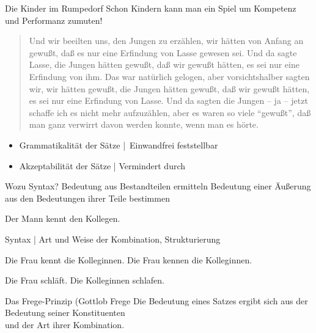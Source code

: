  
\begin{frame}
  {Die Kinder im Rumpedorf}
  \onslide<+->
  \onslide<+->
  Schon Kindern kann man ein Spiel um Kompetenz und Performanz zumuten!\\
  \Zeile
  \onslide<+->
  \begin{quote}
    Und wir beeilten uns, den Jungen zu erzählen, wir hätten von Anfang an gewußt, daß es nur eine
    Erfindung von Lasse gewesen sei. Und da sagte Lasse, die Jungen hätten gewußt, daß wir gewußt
    hätten, es sei nur eine Erfindung von ihm. Das war natürlich gelogen, aber vorsichtshalber sagten
    wir, wir hätten gewußt, die Jungen hätten gewußt, daß wir gewußt hätten, es sei nur eine Erfindung
    von Lasse. Und da sagten die Jungen -- ja -- jetzt schaffe ich es nicht mehr aufzuzählen, aber es
    waren so viele "`gewußt"', daß man ganz verwirrt davon werden konnte, wenn man es hörte.
  \end{quote}
  \Zeile
  \begin{itemize}[<+->]
    \item \alert{Grammatikalität} der Sätze | Einwandfrei feststellbar
    \item \alert{Akzeptabilität} der Sätze | Vermindert durch 
  \end{itemize}
\end{frame}

\begin{frame}
  {Wozu Syntax? Bedeutung aus Bestandteilen ermitteln}
  \onslide<+->
  \onslide<+->
  Bedeutung einer Äußerung aus den Bedeutungen ihrer Teile bestimmen\\
  \Viertelzeile
  \begin{exe}
    \ex Der Mann kennt den Kollegen.
  \end{exe}
  \Halbzeile
  \alert{Syntax} | Art und Weise der Kombination, Strukturierung\\
  \Viertelzeile
  \begin{exe}
    \ex
    \begin{xlist}
      \ex Die Frau kennt die Kolleginnen.
      \ex Die Frau kennen die Kolleginnen.
    \end{xlist}
    \ex
    \begin{xlist}
      \ex Die Frau schläft.
      \ex Die Kolleginnen schlafen.
    \end{xlist}
  \end{exe}
  \Halbzeile
  \onslide<+->
  \begin{block}
    {Das Frege-Prinzip (Gottlob Frege}
    Die Bedeutung eines Satzes ergibt sich aus der Bedeutung seiner Konstituenten\\
    und der Art ihrer Kombination.
  \end{block}
\end{frame}
 

